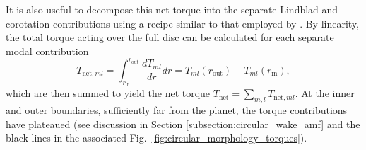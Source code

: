 It is also useful to decompose this net torque into the separate Lindblad and corotation contributions using a recipe similar to that employed by \cite{MirandaRafikov_2020}. By linearity, the total torque acting over the full disc can be calculated for each separate modal contribution
%
\begin{equation}
    T_{\textrm{net},ml} = \int_{r_\textrm{in}}^{r_\textrm{out}} \frac{dT_{ml}}{dr}dr = T_{ml}(r_\textrm{out})-T_{ml}(r_\textrm{in}),
\end{equation}
%
which are then summed to yield the net torque $T_\textrm{net} = \sum_{m,l} T_{\textrm{net},ml}$. At the inner and outer boundaries, sufficiently far from the planet, the torque contributions have plateaued (see discussion in Section \ref{subsection:circular_wake_amf} and the black lines in the associated Fig.~\ref{fig:circular_morphology_torques}). 


